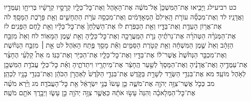 \documentclass[twoside, openany, parskip=half, 11pt]{book}
\begin{document}
כט רביעילג וַיָּבִ֤יאוּ אֶת־הַמִּשְׁכָּן֙ אֶל־מֹשֶׁ֔ה אֶת־הָאֹ֖הֶל וְאֶת־כׇּל־כֵּלָ֑יו קְרָסָ֣יו קְרָשָׁ֔יו בְּרִיחָ֖ו וְעַמֻּדָ֥יו וַאֲדָנָֽיו׃ לד וְאֶת־מִכְסֵ֞ה עוֹרֹ֤ת הָֽאֵילִם֙ הַמְאׇדָּמִ֔ים וְאֶת־מִכְסֵ֖ה עֹרֹ֣ת הַתְּחָשִׁ֑ים וְאֵ֖ת פָּרֹ֥כֶת הַמָּסָֽךְ׃ לה אֶת־אֲר֥וֹן הָעֵדֻ֖ת וְאֶת־בַּדָּ֑יו וְאֵ֖ת הַכַּפֹּֽרֶת׃ לו אֶת־הַשֻּׁלְחָן֙ אֶת־כׇּל־כֵּלָ֔יו וְאֵ֖ת לֶ֥חֶם הַפָּנִֽים׃ לז אֶת־הַמְּנֹרָ֨ה הַטְּהֹרָ֜ה אֶת־נֵרֹתֶ֗יהָ נֵרֹ֛ת הַמַּֽעֲרָכָ֖ה וְאֶת־כׇּל־כֵּלֶ֑יהָ וְאֵ֖ת שֶׁ֥מֶן הַמָּאֽוֹר׃ לח וְאֵת֙ מִזְבַּ֣ח הַזָּהָ֔ב וְאֵת֙ שֶׁ֣מֶן הַמִּשְׁחָ֔ה וְאֵ֖ת קְטֹ֣רֶת הַסַּמִּ֑ים וְאֵ֕ת מָסַ֖ךְ פֶּ֥תַח הָאֹֽהֶל׃ לט אֵ֣ת ׀ מִזְבַּ֣ח הַנְּחֹ֗שֶׁת וְאֶת־מִכְבַּ֤ר הַנְּחֹ֙שֶׁת֙ אֲשֶׁר־ל֔וֹ אֶת־בַּדָּ֖יו וְאֶת־כׇּל־כֵּלָ֑יו אֶת־הַכִּיֹּ֖ר וְאֶת־כַּנּֽוֹ׃ מ אֵת֩ קַלְעֵ֨י הֶחָצֵ֜ר אֶת־עַמֻּדֶ֣יהָ וְאֶת־אֲדָנֶ֗יהָ וְאֶת־הַמָּסָךְ֙ לְשַׁ֣עַר הֶֽחָצֵ֔ר אֶת־מֵיתָרָ֖יו וִיתֵדֹתֶ֑יהָ וְאֵ֗ת כׇּל־כְּלֵ֛י עֲבֹדַ֥ת הַמִּשְׁכָּ֖ן לְאֹ֥הֶל מוֹעֵֽד׃ מא אֶת־בִּגְדֵ֥י הַשְּׂרָ֖ד לְשָׁרֵ֣ת בַּקֹּ֑דֶשׁ אֶת־בִּגְדֵ֤י הַקֹּ֙דֶשׁ֙ לְאַהֲרֹ֣ן הַכֹּהֵ֔ן וְאֶת־בִּגְדֵ֥י בָנָ֖יו לְכַהֵֽן׃ מב כְּכֹ֛ל אֲשֶׁר־צִוָּ֥ה יְהֹוָ֖ה אֶת־מֹשֶׁ֑ה כֵּ֤ן עָשׂוּ֙ בְּנֵ֣י יִשְׂרָאֵ֔ל אֵ֖ת כׇּל־הָעֲבֹדָֽה׃ מג וַיַּ֨רְא מֹשֶׁ֜ה אֶת־כׇּל־הַמְּלָאכָ֗ה וְהִנֵּה֙ עָשׂ֣וּ אֹתָ֔הּ כַּאֲשֶׁ֛ר צִוָּ֥ה יְהֹוָ֖ה כֵּ֣ן עָשׂ֑וּ וַיְבָ֥רֶךְ אֹתָ֖ם מֹשֶֽׁה׃
\end{document}
